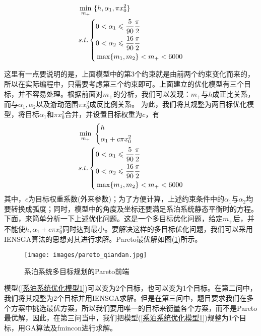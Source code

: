             \begin{align}
            \label{系泊系统优化模型1}
            & \min_{m_+} \ \{h,\alpha_1,\pi x_0^2\}\\
            & s.t.\left\{
            \begin{aligned}
            & 0 < \alpha_1 \leqslant \frac{5}{90}\frac{\pi}{2}\\
            & 0 < \alpha_2 \leqslant \frac{16}{90}\frac{\pi}{2}\\
            & \max\{m_1,m_2\} < m_+ < 6000
            \end{aligned}
            \right.\notag
            \end{align}
            \par
            这里有一点要说明的是，上面模型中的第3个约束就是由前两个约束变化而来的，所以在实际编程中，只需要考虑第三个约束即可。上面建立的优化模型有三个目标，并不容易处理。根据前面对$m_+$的分析，我们可以发现：$m_+$与$h$成正比关系，而与$\alpha_1,\alpha_2$以及游动范围$\pi x_0^2$成反比例关系。
            为此，我们将其规整为两目标优化模型，将目标$\alpha_1$和$\pi x_0^2$合并，并设置目标权重为$c$，有
            \begin{align}
            \label{系泊系统优化模型2}
            & \min_{m_+}\ \left\{
            \begin{aligned}
            & h\\
            & \alpha_1+c\pi x_0^2
            \end{aligned}
            \right.\\
            & s.t.\left\{
            \begin{aligned}
            & 0 < \alpha_1 \leqslant \frac{5}{90}\frac{\pi}{2}\\
            & 0 < \alpha_2 \leqslant \frac{16}{90}\frac{\pi}{2}\\
            & \max\{m_1,m_2\} < m_+ < 6000
            \end{aligned}
            \right.\notag
            \end{align}
            其中，$c$为目标权重系数(外来参数)；为了方便计算，上述约束条件中的$\alpha_1$与$\alpha_2$均要转换成弧度；同时，模型中的角度及坐标还要满足系泊系统静态平衡时的方程。下面，来简单分析一下上述优化问题。这是一个多目标优化问题，给定$m_+$后，并不能使$h,\alpha_1+c\pi x_0^2$同时达到最小。要解决这样的多目标优化问题，我们可以采用IENSGA算法的思想对其进行求解。Pareto最优解如图(\ref{系泊系统多目标规划的Pareto前端})所示。
            \begin{figure}
                \centering
                \texttt{[image: images/pareto\_qiandan.jpg]}
                \caption{系泊系统多目标规划的Pareto前端}
                \label{系泊系统多目标规划的Pareto前端}
            \end{figure}
            \par
            模型(\ref{系泊系统优化模型1})可以变为2个目标，也可以变为1个目标。在第二问中，我们将其规整为2个目标并用IENSGA求解。但是在第三问中，题目要求我们在多个方案中挑选最优方案，所以我们要用唯一的目标来衡量各个方案，而不是Pareto最优解，因此，在第三问当中，我们把模型(\ref{系泊系统优化模型1})规整为1个目标，用GA算法及fmincon进行求解。

